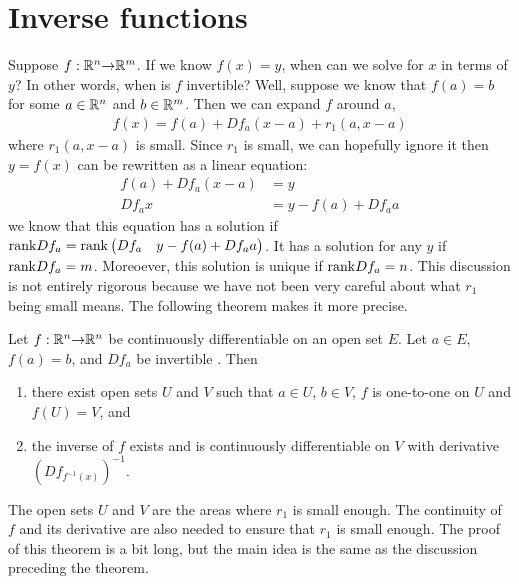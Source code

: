 \section{Inverse functions}

Suppose $f: \mathbb{R}^n {\rightarrow} \mathbb{R}^m$. If we know $f(x) = y$, when can we solve
for $x$ in terms of $y$? In other words, when is $f$ invertible? Well,
suppose we know that $f(a) = b$ for some $a \in \mathbb{R}^n$ and $b \in
\mathbb{R}^m$. Then we can expand $f$ around $a$,
\begin{align*}
  f(x) = f(a) + Df_a (x-a) + r_1(a,x-a)
\end{align*}
where $r_1(a,x-a)$ is small. Since $r_1$ is small, we can hopefully
ignore it then $y = f(x)$ can be rewritten as a linear equation:
\begin{align*}
  f(a) + Df_a (x-a) & = y\\
  Df_a x&  = y - f(a) + Df_a a
\end{align*}
we know that this equation has a solution if $\mathrm{rank} Df_a =
\mathrm{rank} \begin{pmatrix} Df_a &  y - f(a) + Df_a a \end{pmatrix}$. It has
a solution for any $y$ if $\mathrm{rank} Df_a = m$. Moreoever, this solution
is unique if $\mathrm{rank} Df_a = n$. This discussion is not entirely
rigorous because we have not been very careful about what $r_1$ being
small means. The following theorem makes it more precise.
\begin{theorem}
  Let $f: \mathbb{R}^n {\rightarrow} \mathbb{R}^n$ be continuously differentiable on an open set
  $E$. Let $a \in E$, $f(a) = b$, and $Df_a$ be invertible . Then 
  \begin{enumerate}
  \item there exist open sets $U$ and $V$ such that $a \in U$,
    $b \in
    V$, $f$ is one-to-one on $U$ and $f(U) = V$, and
  \item the inverse of $f$ exists and is continuously differentiable
    on $V$ with derivative $\left(Df_{f^{-1}(x)}\right)^{-1}$.
  \end{enumerate}
\end{theorem}
The open sets $U$ and $V$ are the areas where $r_1$ is small
enough. The continuity of $f$ and its derivative are also needed to
ensure that $r_1$ is small enough. The proof of this theorem is a bit
long, but the main idea is the same as the discussion preceding the
theorem. 

